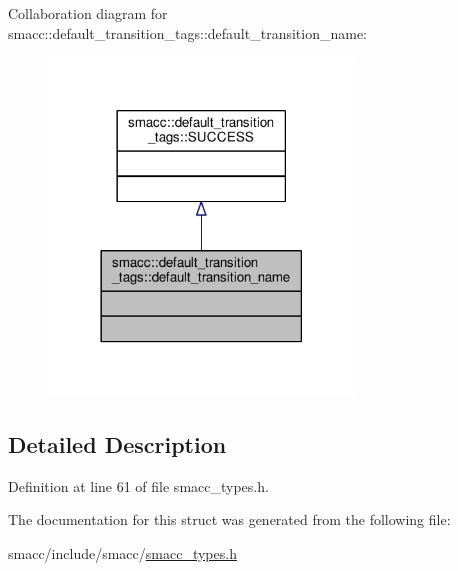 Collaboration diagram for smacc\+:\+:default\+\_\+transition\+\_\+tags\+:\+:default\+\_\+transition\+\_\+name\+:\nopagebreak
\begin{figure}[H]
\begin{center}
\leavevmode
\includegraphics[width=230pt]{structsmacc_1_1default__transition__tags_1_1default__transition__name__coll__graph}
\end{center}
\end{figure}


\subsection{Detailed Description}


Definition at line 61 of file smacc\+\_\+types.\+h.



The documentation for this struct was generated from the following file\+:\begin{DoxyCompactItemize}
\item 
smacc/include/smacc/\hyperlink{smacc__types_8h}{smacc\+\_\+types.\+h}\end{DoxyCompactItemize}
